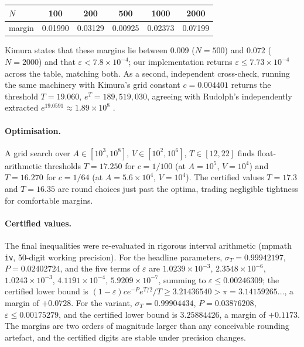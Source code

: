 \documentclass[11pt]{article}
\begin{document}
\begin{center}
\begin{tabular}{lccccc}
\toprule
$N$ & 100 & 200 & 500 & 1000 & 2000 \\
\midrule
margin & 0.01990 & 0.03129 & 0.00925 & 0.02373 & 0.07199 \\
\bottomrule
\end{tabular}
\end{center}

Kimura states that these margins lie between $0.009$ ($N = 500$) and
$0.072$ ($N = 2000$) and that $\varepsilon < 7.8\times 10^{-4}$; our
implementation returns $\varepsilon \le 7.73\times 10^{-4}$ across the
table, matching both. As a second, independent cross-check, running the
same machinery with Kimura's grid constant $c = 0.004401$ returns the
threshold $T = 19.060$, $e^T = 189{,}519{,}030$, agreeing with Rudolph's
independently extracted $e^{19.0591} \approx 1.89\times 10^8$ \cite{tao}.

\paragraph{Optimisation.}
A grid search over $A \in [10^3, 10^8]$, $V \in [10^2, 10^6]$,
$T \in [12, 22]$ finds float-arithmetic thresholds $T = 17.250$ for
$c = 1/100$ (at $A = 10^5$, $V = 10^4$) and $T = 16.270$ for $c = 1/64$
(at $A = 5.6\times 10^4$, $V = 10^4$). The certified values
$T = 17.3$ and $T = 16.35$ are round choices just past the optima,
trading negligible tightness for comfortable margins.

\paragraph{Certified values.}
The final inequalities were re-evaluated in rigorous interval
arithmetic (mpmath \texttt{iv}, 50-digit working precision). For the
headline parameters, $\sigma_T = 0.99942197$, $P = 0.02402724$, and the
five terms of $\varepsilon$ are
$1.0239\times 10^{-3}$, $2.3548\times 10^{-6}$, $1.0243\times 10^{-3}$,
$4.1191\times 10^{-4}$, $5.9209\times 10^{-7}$, summing to
$\varepsilon \le 0.00246309$; the certified lower bound is
$(1-\varepsilon) c e^{-P} e^{T/2}/T \ge 3.21436540 > \pi = 3.14159265\ldots$,
a margin of $+0.0728$. For the variant, $\sigma_T = 0.99904434$,
$P = 0.03876208$, $\varepsilon \le 0.00175279$, and the certified lower
bound is $3.25884426$, a margin of $+0.1173$. The margins are two orders
of magnitude larger than any conceivable rounding artefact, and the
certified digits are stable under precision changes.
\end{document}
